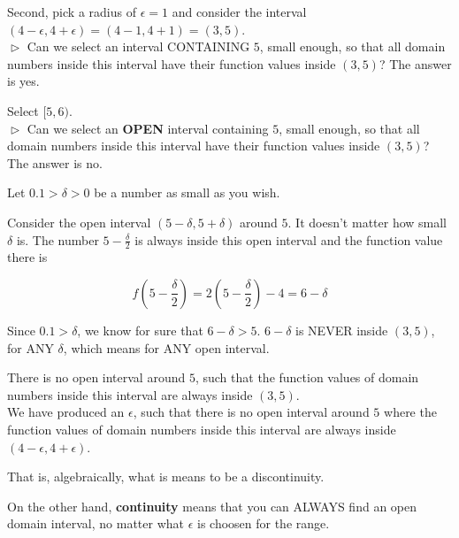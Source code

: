 \documentclass{ximera}
\begin{document}
\begin{example}
Second, pick a radius of $\epsilon = 1$ and consider the interval $(4-\epsilon , 4+\epsilon) = (4-1 , 4+1) = (3,5)$. \\


$\vartriangleright$ Can we select an interval CONTAINING $5$, small enough, so that all domain numbers inside this interval have their function values inside $(3,5)$?  The answer is yes.

Select $[5, 6)$. \\



$\vartriangleright$ Can we select an \textbf{OPEN} interval containing $5$, small enough, so that all domain numbers inside this interval have their function values inside $(3,5)$?  The answer is no.




Let $0.1 > \delta > 0$ be a number as small as you wish.

Consider the open interval $(5-\delta, 5+\delta)$ around $5$. It doesn't matter how small $\delta$ is.  The number $5 - \frac{\delta}{2}$ is always inside this open interval and the function value there is 

\[  f\left(5 - \frac{\delta}{2}\right)     = 2\left(5 - \frac{\delta}{2}\right)-4 = 6 - \delta     \]


Since $0.1 > \delta$, we know for sure that $6 - \delta > 5$.  $6 - \delta$ is NEVER inside $(3, 5)$, for ANY $\delta$, which means for ANY open interval.

There is no open interval around $5$, such that the function values of domain numbers inside this interval are always inside $(3,5)$. \\




We have produced an $\epsilon$, such that there is no open interval around $5$ where the function values of domain numbers inside this interval are always inside $(4-\epsilon , 4+\epsilon)$.


That is, algebraically, what is means to be a discontinuity.




\end{example}




On the other hand, \textbf{continuity} means that you can ALWAYS find an open domain interval, no matter what $\epsilon$ is choosen for the range. \\
\end{document}

